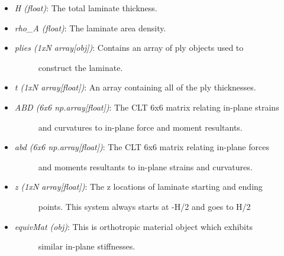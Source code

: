 \documentclass[letterpaper,10pt,english]{sphinxmanual}
\begin{document}
\begin{fulllineitems}
\begin{itemize}
\begin{description}
\end{description}

\item {} 
\emph{H (float)}: The total laminate thickness.

\item {} 
\emph{rho\_A (float)}: The laminate area density.

\item {} \begin{description}
\item[{\emph{plies (1xN array{[}obj{]})}: Contains an array of ply objects used to}] \leavevmode
construct the laminate.

\end{description}

\item {} 
\emph{t (1xN array{[}float{]})}: An array containing all of the ply thicknesses.

\item {} \begin{description}
\item[{\emph{ABD (6x6 np.array{[}float{]})}: The CLT 6x6 matrix relating in-plane strains}] \leavevmode
and curvatures to in-plane force and moment resultants.

\end{description}

\item {} \begin{description}
\item[{\emph{abd (6x6 np.array{[}float{]})}: The CLT 6x6 matrix relating in-plane forces}] \leavevmode
and moments resultants to in-plane strains and curvatures.

\end{description}

\item {} \begin{description}
\item[{\emph{z (1xN array{[}float{]})}: The z locations of laminate starting and ending}] \leavevmode
points. This system always starts at -H/2 and goes to H/2

\end{description}

\item {} \begin{description}
\item[{\emph{equivMat (obj)}: This is orthotropic material object which exhibits}] \leavevmode
similar in-plane stiffnesses.


\end{description}
\end{itemize}
\end{fulllineitems}
\end{document}
